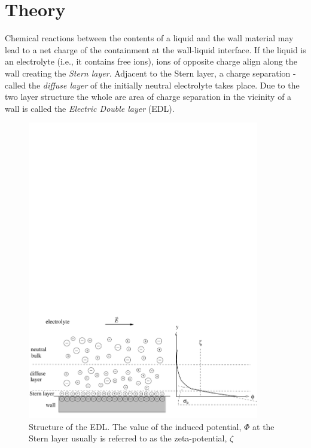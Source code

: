 \section{Theory}
Chemical reactions between the contents of a liquid and the wall material may lead to a net charge of the containment at the wall-liquid interface. If the liquid is an electrolyte (i.e., it contains free ions), ions of opposite charge align along the wall creating the \textit{Stern layer}. Adjacent to the Stern layer, a charge separation - called the \textit{diffuse layer} of the initially neutral electrolyte takes place. Due to the two layer structure the whole are area of charge separation in the vicinity of a wall is called the \textit{Electric Double layer} (EDL). 
\begin{figure}[tbhp]
\centerline{\includegraphics[width=0.9\textwidth]{EDL_bw.pdf}}
\caption{\label{ek:Fig.EDL} Structure of the EDL. The value of the induced potential, $\Phi$ at the Stern layer usually is referred to as the zeta-potential, $\zeta$}
\end{figure}
